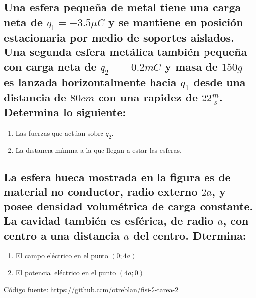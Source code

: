 \documentclass[10pt, twoside]{article}
\begin{document}
\subsection*{Una esfera pequeña de metal tiene una carga neta de $q_1 =-3.5\mu C$
y se mantiene en posición estacionaria por medio de soportes aislados.
Una segunda esfera metálica también pequeña con carga neta de $q_2 =-0.2mC$ y masa de $150g$ es
lanzada horizontalmente hacia $q_1$ desde una distancia de $80cm$ con una rapidez de
$22\frac{m}{s}$. Determina lo siguiente:}%
\begin{enumerate}[label=\textbf{\alph*)}]
	\item Las fuerzas que actúan sobre $q_2$.
	\setcounter{enumi}{2}
	\item La distancia mínima a la que llegan a estar las esferas.
\end{enumerate}

\subsection*{La esfera hueca mostrada en la figura es de material no conductor,
radio externo $2a$, y posee densidad volumétrica de carga constante.
La cavidad también es esférica, de radio $a$, con centro a una distancia
$a$ del centro. Dtermina:}%
\begin{enumerate}[label=\textbf{\alph*)}]
	\item El campo eléctrico en el punto $(0;4a)$
	\item El potencial eléctrico en el punto $(4a;0)$
\end{enumerate}

\vfill
Código fuente: \url{https://github.com/otreblan/fisi-2-tarea-2}
\end{document}
